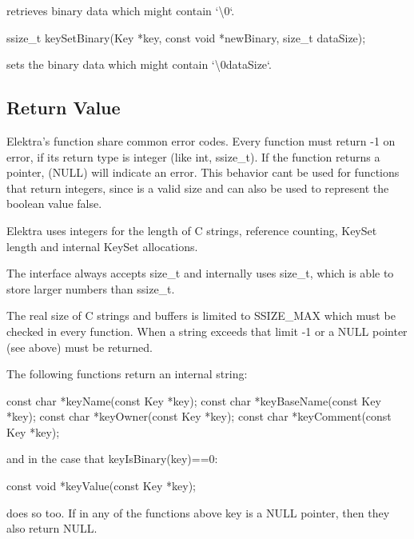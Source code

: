 retrieves binary data which might contain `\textquotesingle{}\textbackslash{}0\textquotesingle{}`. \begin{DoxyVerb}ssize_t keySetBinary(Key *key, const void *newBinary, size_t dataSize);
\end{DoxyVerb}


sets the binary data which might contain `\textquotesingle{}\textbackslash{}0data\+Size`.

\subsection*{Return Value}

Elektra’s function share common error codes. Every function must return {\ttfamily -\/1} on error, if its return type is integer (like {\ttfamily int}, {\ttfamily ssize\+\_\+t}). If the function returns a pointer, {} ({\ttfamily N\+U\+LL}) will indicate an error. This behavior can\textquotesingle{}t be used for functions that return integers, since {} is a valid size and can also be used to represent the boolean value {\ttfamily false}.

Elektra uses integers for the length of C strings, reference counting, {\ttfamily Key\+Set} length and internal {\ttfamily Key\+Set} allocations.

The interface always accepts {\ttfamily size\+\_\+t} and internally uses {\ttfamily size\+\_\+t}, which is able to store larger numbers than {\ttfamily ssize\+\_\+t}.

The real size of C strings and buffers is limited to {\ttfamily S\+S\+I\+Z\+E\+\_\+\+M\+AX} which must be checked in every function. When a string exceeds that limit {\ttfamily -\/1} or a {\ttfamily N\+U\+LL} pointer (see above) must be returned.

The following functions return an internal string\+: \begin{DoxyVerb}const char *keyName(const Key *key);
const char *keyBaseName(const Key *key);
const char *keyOwner(const Key *key);
const char *keyComment(const Key *key);
\end{DoxyVerb}


and in the case that {\ttfamily key\+Is\+Binary(key)==0}\+: \begin{DoxyVerb}const void *keyValue(const Key *key);
\end{DoxyVerb}


does so too. If in any of the functions above {\ttfamily key} is a {\ttfamily N\+U\+LL} pointer, then they also return {\ttfamily N\+U\+LL}.

